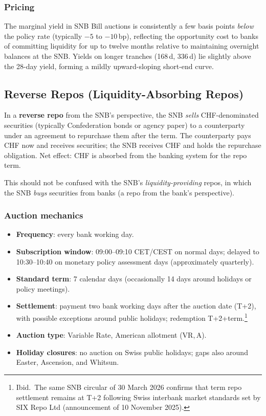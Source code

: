 \documentclass[12pt,a4paper]{article}
\begin{document}
\subsubsection{Pricing}

The marginal yield in SNB Bill auctions is consistently a few basis points
\emph{below} the policy rate (typically $-5$ to $-10$\,bp), reflecting the
opportunity cost to banks of committing liquidity for up to twelve months
relative to maintaining overnight balances at the SNB.  Yields on longer
tranches (168\,d, 336\,d) lie slightly above the 28-day yield, forming a
mildly upward-sloping short-end curve.

\subsection{Reverse Repos (Liquidity-Absorbing Repos)}

In a \textbf{reverse repo} from the SNB's perspective, the SNB \emph{sells}
CHF-denominated securities (typically Confederation bonds or agency paper) to
a counterparty under an agreement to repurchase them after the term.  The
counterparty pays CHF now and receives securities; the SNB receives CHF and
holds the repurchase obligation.  Net effect: CHF is absorbed from the banking
system for the repo term.

\noindent This should not be confused with the SNB's \emph{liquidity-providing}
repos, in which the SNB \emph{buys} securities from banks (a repo from the
bank's perspective).

\subsubsection{Auction mechanics}

\begin{itemize}[leftmargin=1.5em, itemsep=2pt]
  \item \textbf{Frequency}: every bank working day.
  \item \textbf{Subscription window}: 09:00--09:10 CET/CEST on normal days;
    delayed to 10:30--10:40 on monetary policy assessment days
    (approximately quarterly).
  \item \textbf{Standard term}: 7 calendar days (occasionally 14 days
    around holidays or policy meetings).
  \item \textbf{Settlement}: payment two bank working days after the auction
    date (T+2), with possible exceptions around public holidays; redemption
    T+2+term.\footnote{Ibid.\ The same SNB circular of 30 March 2026 confirms
    that term repo settlement remains at T+2 following Swiss interbank market
    standards set by SIX Repo Ltd (announcement of 10 November 2025).}
  \item \textbf{Auction type}: Variable Rate, American allotment (VR,\,A).
  \item \textbf{Holiday closures}: no auction on Swiss public holidays; gaps
    also around Easter, Ascension, and Whitsun.
\end{itemize}
\end{document}
